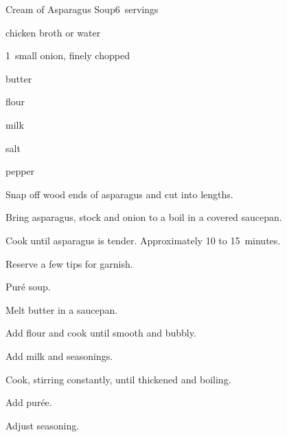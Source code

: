 \begin{recipe}{Cream of Asparagus Soup}{}{6~servings}

\begin{ingredients}
\item {} 
\item {} chicken broth or water
\item 1~small onion, finely chopped
\item {} butter
\item {} flour
\item {} milk
\item salt
\item pepper
\end{ingredients}

\begin{directions}
\item Snap off wood ends of asparagus and cut into  lengths.
\item Bring asparagus, stock and onion to a boil in a covered saucepan.
\item Cook until asparagus is tender. Approximately 10 to 15~minutes.
\item Reserve a few tips for garnish.
\item Pur\'e soup.
\item Melt butter in a saucepan.
\item Add flour and cook until smooth and bubbly.
\item Add milk and seasonings.
\item Cook, stirring constantly, until thickened and boiling.
\item Add pur\'ee.
\item Adjust seasoning.
\end{directions}

\end{recipe}
